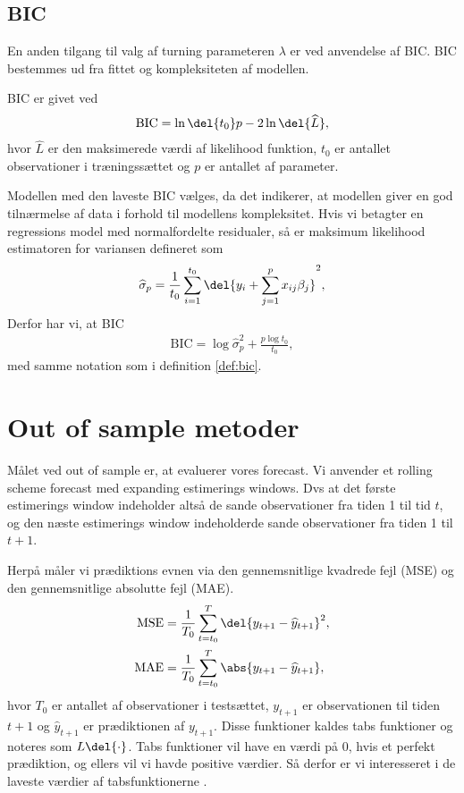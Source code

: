 \subsection{BIC}
En anden tilgang til valg af turning parameteren $\lambda$ er ved anvendelse af BIC.
BIC bestemmes ud fra fittet og kompleksiteten af modellen. 
\begin{defn}\label{def:bic}
BIC er givet ved
\begin{align*}
\text{BIC} = \ln\del{t_0}p - 2 \ln\del{\widehat{L}}, 
\end{align*}
hvor $\widehat{L}$ er den maksimerede værdi af likelihood funktion, $t_0$ er antallet observationer i træningssættet og $p$ er antallet af parameter.
\end{defn} 
Modellen med den laveste BIC vælges, da det indikerer, at modellen giver en god tilnærmelse af data i forhold til modellens kompleksitet. 
Hvis vi betagter en regressions model med normalfordelte residualer, så er maksimum likelihood estimatoren for variansen defineret som
\begin{align*}
\widehat{\sigma}_p = \frac{1}{t_0} \sum_{i=1}^{t_0} \del{y_i + \sum_{j=1}^p x_{ij}\beta_j}^2,
\end{align*}
Derfor har vi, at BIC 
\begin{align*}
\text{BIC} = \log \widehat{\sigma}^2_p + \frac{p \log t_0}{t_0},
\end{align*}
med samme notation som i definition  \ref{def:bic}.

\section{Out of sample metoder}
Målet ved out of sample er, at evaluerer vores forecast. 
Vi anvender et rolling scheme forecast med expanding estimerings windows. 
Dvs at det første estimerings window indeholder altså de sande observationer fra tiden 1 til tid $t$, og den næste estimerings window indeholderde sande observationer fra tiden 1 til $t+1$.

Herpå måler vi prædiktions evnen via den gennemsnitlige kvadrede fejl (MSE) og den gennemsnitlige absolutte fejl (MAE).
\begin{align}
\text{MSE} & =  \frac{1}{T_0} \sum_{t=t_0 }^{T} \del{y_{t+1} - \widehat{y}_{t +1}}^2, \label{eq:mse}  \\
\text{MAE} & =  \frac{1}{T_0} \sum_{t=t_0}^{T}  \abs{y_{t+1} - \widehat{y}_{t+1}}, \label{eq:mae} 
\end{align} 
hvor $T_0$ er antallet af observationer i testsættet, $y_{t +1}$ er observationen til tiden $t +1$ og $\widehat{y}_{t+1}$ er prædiktionen af $y_{t+1}$.
Disse funktioner kaldes tabs funktioner og noteres som $L\del{\cdot}$.
Tabs funktioner vil have en værdi på 0, hvis et perfekt prædiktion, og ellers vil vi havde positive værdier. Så derfor er vi interesseret i de laveste værdier af tabsfunktionerne . 

